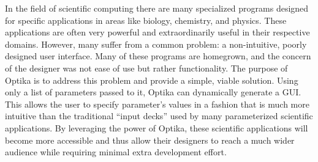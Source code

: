 In the field of scientific computing there are many specialized programs designed for specific applications 
in areas like biology, chemistry, and physics. These applications are often very powerful and extraordinarily 
useful in their respective domains. However, many suffer from a common problem: a non-intuitive, poorly designed user interface. Many 
of these programs are homegrown, and the concern of the designer was not ease of use but rather 
functionality. The purpose of Optika is to address this problem and provide a simple, viable solution. Using
only a list of parameters passed to it, Optika can dynamically generate a GUI. This allows the user to specify 
parameter's values in a fashion that is much more intuitive than the traditional ``input decks'' used by many 
parameterized scientific applications. By leveraging the power of Optika, these scientific applications 
will become more accessible and thus allow their designers to reach a much wider audience while requiring 
minimal extra development effort.
